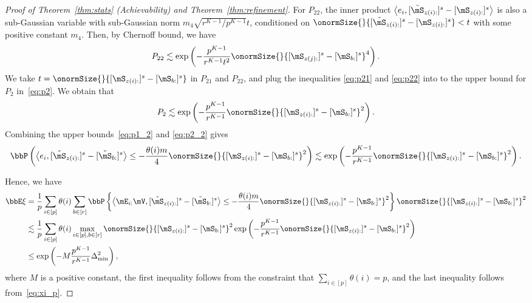 \documentclass[lettersize,onecolumn,journal]{IEEEtran}
\theoremstyle{definition}
\theoremstyle{definition}
\newcommand{\of}[1]{\left(#1\right)}
\newcommand{\offf}[1]{\left\{#1\right\}}
\newcommand{\ang}[1]{\left\langle#1\right\rangle}
\begin{document}
\begin{proof}[Proof of Theorem~\ref{thm:stats} (Achievability) and Theorem~\ref{thm:refinement}]
    For $P_{22}$, the inner product $ \ang{e_i, [ \tilde  \mS_{z(i):} ]^s - [ \mS_{z(i):} ]^s}$ is also a sub-Gaussian variable with sub-Gaussian norm $ m_4 \sqrt{ r^{K-1}/ p^{K-1} } t$, conditioned on $\onormSize{}{ [ \tilde  \mS_{z(i):} ]^s - [ \mS_{z(i):} ]^s } < t$ with some positive constant $m_4$. Then, by Chernoff bound, we have 
    \begin{equation}\label{eq:p22}
        P_{22} \lesssim \exp \of{  - \frac{p^{K-1}}{r^{K-1} t^2}   \onormSize{}{ [ \mS_{z(j):}  ]^s - [ \mS_{b:}  ]^s  }^4 }. 
    \end{equation}
    We take $t =  \onormSize{}{ [ \mS_{z(i):}  ]^s - [ \mS_{b:}  ]^s  }$ in $P_{21}$ and $P_{22}$, and plug the inequalities \eqref{eq:p21} and \eqref{eq:p22} into to the upper bound for $P_2$ in~\eqref{eq:p2}. We obtain that 
    \begin{equation}\label{eq:p2_2}
        P_2 \lesssim \exp \of{  - \frac{p^{K-1}}{r^{K-1}}   \onormSize{}{ [ \mS_{z(i):}  ]^s - [ \mS_{b:}  ]^s  }^2 }.
    \end{equation}
    Combining the upper bounds~\eqref{eq:p1_2} and \eqref{eq:p2_2} gives 
       \begin{equation}\label{eq:xi_p}
          \bbP \of{ \ang{ e_i, [  \tilde \mS_{z(i):} ]^s - [  \tilde \mS_{b:} ]^s }  \leq - \frac{\theta(i) m}{4} \onormSize{}{ [ \mS_{z(i):}  ]^s - [ \mS_{b:}  ]^s  }^2} \lesssim  \exp \of{  - \frac{p^{K-1}}{r^{K-1}}   \onormSize{}{ [ \mS_{z(i):}  ]^s - [ \mS_{b:}  ]^s  }^2 }.
    \end{equation}
    
    Hence, we have 
    \begin{align}
        \bbE \xi & =  \frac{1}{p} \sum_{i \in [p]} \theta(i) \sum_{b \in [r]} \bbP \offf{  \ang{ \mE_{i:} \mV, [  \tilde \mS_{z(i):} ]^s - [  \tilde \mS_{b:} ]^s }  \leq - \frac{\theta(i) m}{4} \onormSize{}{ [ \mS_{z(i):}  ]^s - [ \mS_{b:}  ]^s  }^2 } \onormSize{}{ [ \mS_{z(i):}  ]^s - [ \mS_{ b:}  ]^s  }^2 \\
        &\lesssim \frac{1}{p} \sum_{i \in [p]}  \theta(i) \max_{i \in [p], b \in [r]}  \onormSize{}{ [ \mS_{z(i):}  ]^s - [ \mS_{b:}  ]^s  }^2   \exp \of{  - \frac{p^{K-1}}{r^{K-1}}   \onormSize{}{ [ \mS_{z(i):}  ]^s - [ \mS_{b:}  ]^s  }^2 } \\
        & \leq \exp \of{  - M \frac{p^{K-1}}{r^{K-1}}   \Delta_{\min}^2 }, \label{eq:constant_M}
    \end{align}
    where $M$ is a positive constant, the first inequality follows from the constraint that $\sum_{i \in [p]} \theta(i) = p$, and the last inequality follows from~\eqref{eq:xi_p}.
    

\end{proof}
\end{document}
